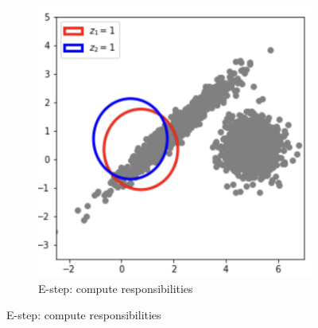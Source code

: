 \documentclass[11pt]{article}
\begin{document}
\begin{figure}[!ht]
\begin{subfigure}[t]{0.3\textwidth}
		\includegraphics[width=\textwidth]{../imgs/gmm_p2.png}
		\caption*{\small E-step: compute responsibilities}
	\end{subfigure}

	\vspace{0.2em}


\end{figure}
\end{document}
